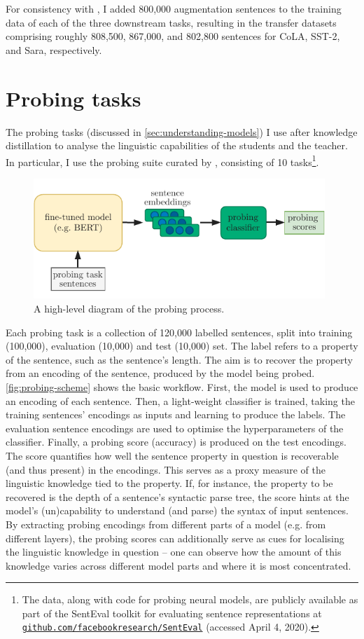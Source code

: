 \documentclass[bsc,frontabs,singlespacing,parskip,deptreport]{infthesis}
\newcommand\rurl[1]{%
  \href{https://#1}{\nolinkurl{#1}}%
}
\begin{document}
{{    For consistency with \citet{Tang_2019b}, I added 800,000 augmentation sentences to the training data of each of the three downstream tasks, resulting in the transfer datasets comprising roughly 808,500, 867,000, and 802,800 sentences for CoLA, SST-2, and Sara, respectively.
  }

  \section{Probing tasks}{
    The probing tasks (discussed in \autoref{sec:understanding-models}) I use after knowledge distillation to analyse the linguistic capabilities of the students and the teacher. In particular, I use the probing suite curated by \citet{Conneau_2018}, consisting of 10 tasks\footnote{The data, along with code for probing neural models, are publicly available as part of the SentEval toolkit for evaluating sentence representations \citep{SentEval-paper} at \rurl{github.com/facebookresearch/SentEval} (accessed April 4, 2020).}.

    \begin{figure}[h!t]
      \centering
      \includegraphics[width=11cm]{graphics/probing-scheme}
      \caption{A high-level diagram of the probing process.}
      \label{fig:probing-scheme}
    \end{figure}

    Each probing task is a collection of 120,000 labelled sentences, split into training (100,000), evaluation (10,000) and test (10,000) set. The label refers to a property of the sentence, such as the sentence's length. The aim is to recover the property from an encoding of the sentence, produced by the model being probed. \autoref{fig:probing-scheme} shows the basic workflow. First, the model is used to produce an encoding of each sentence. Then, a light-weight classifier is trained, taking the training sentences' encodings as inputs and learning to produce the labels. The evaluation sentence encodings are used to optimise the hyperparameters of the classifier. Finally, a probing score (accuracy) is produced on the test encodings. The score quantifies how well the sentence property in question is recoverable (and thus present) in the encodings. This serves as a proxy measure of the linguistic knowledge tied to the property. If, for instance, the property to be recovered is the depth of a sentence's syntactic parse tree, the score hints at the model's (un)capability to understand (and parse) the syntax of input sentences.
    By extracting probing encodings from different parts of a model (e.g. from different layers), the probing scores can additionally serve as cues for localising the linguistic knowledge in question -- one can observe how the amount of this knowledge varies across different model parts and where it is most concentrated.

}}
\end{document}

